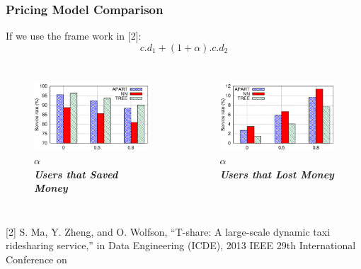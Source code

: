 \documentclass[t]{beamer}
\begin{document}
\begin{frame}\frametitle{Pricing Model Comparison}
If we use the frame work in [2]:
\begin{equation*}
c.d_1 + (1+\alpha).c.d_2
\end{equation*}
\vspace{-0.3in}
\begin{columns}
\begin{figure}
	\centering
    \includegraphics[width = 0.95\columnwidth]{saved.eps}
    \vspace{-0.1in}
    \small{$\alpha$}\\
    \small{\textbf{\textit{Users that Saved Money}}}
\end{figure}
\begin{figure}
	\centering
    \includegraphics[width = 0.95\columnwidth]{lost.eps}
    \vspace{-0.1in}
    \small{$\alpha$}\\
    \small{\textbf{\textit{Users that Lost Money}}}
\end{figure}
\end{columns}
\vspace{0.4in}
\tiny{[2] S. Ma, Y. Zheng, and O. Wolfson, “T-share: A large-scale dynamic taxi ridesharing service,” in Data Engineering (ICDE), 2013 IEEE 29th International Conference on}
\end{frame}
\end{document}
